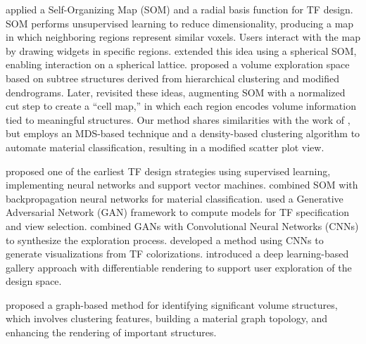 \citet{moura2007} applied a Self-Organizing Map (SOM) and a radial basis function for TF design. SOM performs unsupervised learning to reduce dimensionality, producing a map in which neighboring regions represent similar voxels. Users interact with the map by drawing widgets in specific regions. \citet{khan2015} extended this idea using a spherical SOM, enabling interaction on a spherical lattice. \citet{wang2011} proposed a volume exploration space based on subtree structures derived from hierarchical clustering and modified dendrograms. Later, \citet{cai2017} revisited these ideas, augmenting SOM with a normalized cut step to create a ``cell map,'' in which each region encodes volume information tied to meaningful structures. Our method shares similarities with the work of \citet{cai2017}, but employs an MDS-based technique and a density-based clustering algorithm to automate material classification, resulting in a modified scatter plot view.

\cite{tzeng2005} proposed one of the earliest TF design strategies using supervised learning, implementing neural networks and support vector machines. \citet{wang2006} combined SOM with backpropagation neural networks for material classification. \citet{berger2018} used a Generative Adversarial Network (GAN) framework to compute models for TF specification and view selection. \citet{hong2019} combined GANs with Convolutional Neural Networks (CNNs) to synthesize the exploration process. \citet{kim2021} developed a method using CNNs to generate visualizations from TF colorizations. \citet{pan2024} introduced a deep learning-based gallery approach with differentiable rendering to support user exploration of the design space.

\citet{sharma2020} proposed a graph-based method for identifying significant volume structures, which involves clustering features, building a material graph topology, and enhancing the rendering of important structures.
